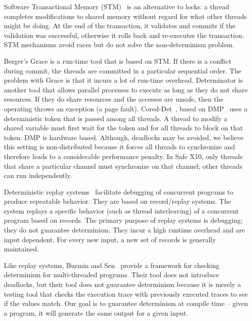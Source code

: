 Software Transactional Memory (STM)~\cite{shavit1995software}
  is an alternative to locks: a thread completes modifications to
shared memory without regard for what other threads might be doing. At the end of the transaction,
it validates and commits if the validation was successful, otherwise it rolls back and re-executes
the transaction. STM mechanisms avoid races but do not solve the non-determinism problem.

Berger's Grace\cite{berger2009grace} is a run-time tool
that is based on STM.
If there is a conflict during commit, the threads are committed in
a particular sequential order.
The problem with Grace is that it incurs a lot of run-time
overhead.
%
Determinator\cite{aviram2010efficient} is another tool
that allows parallel processes to execute as long as they do not share
resources. If they do share resources and the accesses are unsafe, then
the operating throws an exception (a page fault).
%
Cored-Det~\cite{bergan2010coreDet}, based on DMP~\cite{devietti2009dmp}
uses a deterministic token that is passed
among all threads.  A thread to modify a shared variable must first
wait for the token and for all threads to block on that
token. DMP is hardware based.
Although, deadlocks may be avoided, we believe this setting is
non-distributed because it forces all threads to synchronize and
therefore leads to a considerable performance penalty. In Safe X10,
only threads that share a particular channel must synchronize
on that channel; other threads can run independently.

Deterministic replay
systems~\cite{choi1998deterministic,altekar2009odr} facilitate
debugging of concurrent programs to produce repeatable behavior. They
are based on record/replay systems. The system replays a specific
behavior (such as thread interleaving) of a concurrent program based
on records. The primary purpose of replay systems is debugging; they
do not guarantee determinism.  They incur a high runtime overhead and
are input dependent.  For every new input, a new set of records is
generally maintained.

Like replay systems, Burmin and Sen~\cite{Burnim2009asserting} provide a framework for
checking determinism for multi-threaded programs. Their tool does not
introduce deadlocks, but their tool does not guarantee determinism
because it is merely a testing tool that checks the execution trace
with previously executed traces to see if the values match.
Our goal is to guarantee determinism at compile time -- given a program,
it will generate the same output for a given input.




